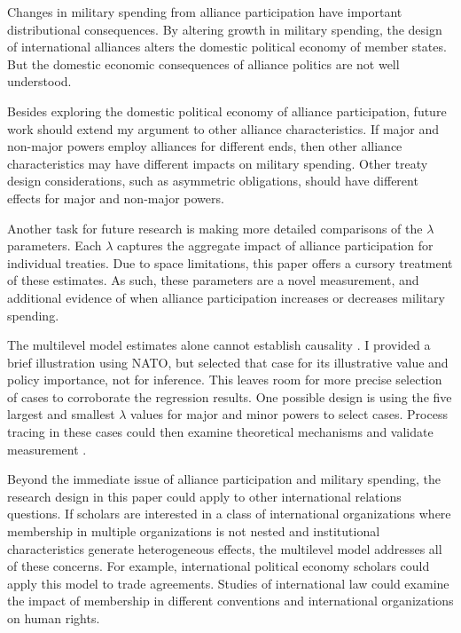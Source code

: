 \documentclass[12pt]{article}
\begin{document}
Changes in military spending from alliance participation have important distributional consequences. 
By altering growth in military spending, the design of international alliances alters the domestic political economy of member states. 
But the domestic economic consequences of alliance politics are not well understood. 


Besides exploring the domestic political economy of alliance participation, future work should extend my argument to other alliance characteristics. 
If major and non-major powers employ alliances for different ends, then other alliance characteristics may have different impacts on military spending. 
Other treaty design considerations, such as asymmetric obligations, should have different effects for major and non-major powers. 


Another task for future research is making more detailed comparisons of the $\lambda$ parameters. 
Each $\lambda$ captures the aggregate impact of alliance participation for individual treaties.
Due to space limitations, this paper offers a cursory treatment of these estimates. 
As such, these parameters are a novel measurement, and additional evidence of when alliance participation increases or decreases military spending. 


The multilevel model estimates alone cannot establish causality \citep{Seawright2016}. 
I provided a brief illustration using NATO, but selected that case for its illustrative value and policy importance, not for inference. 
This leaves room for more precise selection of cases to corroborate the regression results. 
One possible design is using the five largest and smallest $\lambda$ values for major and minor powers to select cases. 
Process tracing in these cases could then examine theoretical mechanisms and validate measurement \citep{Seawright2016}. 


Beyond the immediate issue of alliance participation and military spending, the research design in this paper could apply to other international relations questions.
If scholars are interested in a class of international organizations where membership in multiple organizations is not nested and institutional characteristics generate heterogeneous effects, the multilevel model addresses all of these concerns.
For example, international political economy scholars could apply this model to trade agreements. 
Studies of international law could examine the impact of membership in different conventions and international organizations on human rights. 
\end{document}
